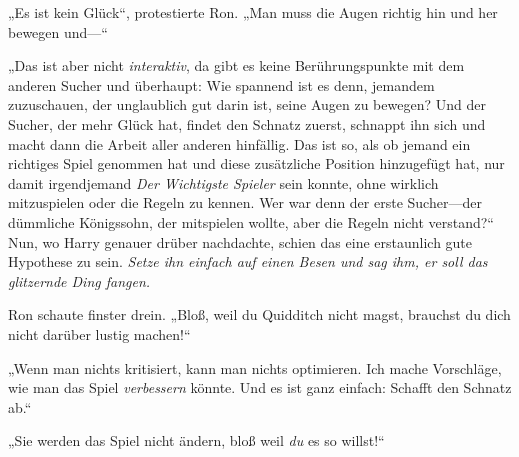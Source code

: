„Es ist kein Glück“, protestierte Ron. „Man muss die Augen richtig hin und her bewegen und—“

„Das ist aber nicht \emph{interaktiv}, da gibt es keine Berührungspunkte mit dem anderen Sucher und überhaupt: Wie spannend ist es denn, jemandem zuzuschauen, der unglaublich gut darin ist, seine Augen zu bewegen? Und der Sucher, der mehr Glück hat, findet den Schnatz zuerst, schnappt ihn sich und macht dann die Arbeit aller anderen hinfällig. Das ist so, als ob jemand ein richtiges Spiel genommen hat und diese zusätzliche Position hinzugefügt hat, nur damit irgendjemand \emph{Der Wichtigste Spieler} sein konnte, ohne wirklich mitzuspielen oder die Regeln zu kennen. Wer war denn der erste Sucher—der dümmliche Königssohn, der mitspielen wollte, aber die Regeln nicht verstand?“
Nun, wo Harry genauer drüber nachdachte, schien das eine erstaunlich gute Hypothese zu sein. \emph{Setze ihn einfach auf einen Besen und sag ihm, er soll das glitzernde Ding fangen.}

Ron schaute finster drein. „Bloß, weil du Quidditch nicht magst, brauchst du dich nicht darüber lustig machen!“

„Wenn man nichts kritisiert, kann man nichts optimieren. Ich mache Vorschläge, wie man das Spiel \emph{verbessern} könnte. Und es ist ganz einfach: Schafft den Schnatz ab.“

„Sie werden das Spiel nicht ändern, bloß weil \emph{du} es so willst!“

